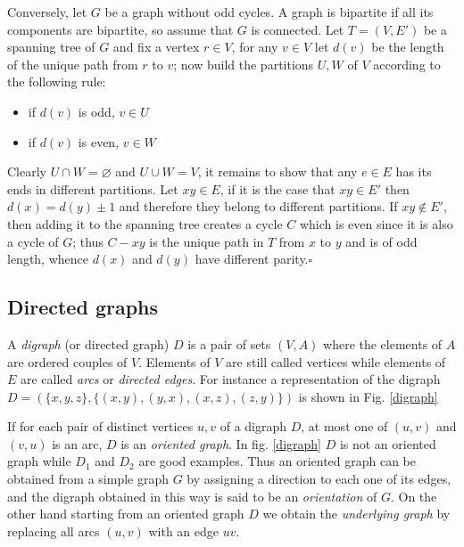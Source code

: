 \documentclass[a4paper,12pt,oneside]{book}
\newcommand*{\QED}{\hfill\ensuremath{\square}}
\let\emptyset\varnothing
\begin{document}
Conversely, let $G$ be a graph without odd cycles. A graph is bipartite if all its components are bipartite, so assume that $G$ is connected. Let $T=(V,E')$ be a spanning tree of $G$ and fix a vertex $r\in V$, for any $v\in V$ let $d(v)$ be the length of the unique path from $r$ to $v$; now build the partitions $U,W$ of $V$ according to the following rule:
\begin{itemize}
\item if $d(v)$ is odd, $v\in U$
\item if $d(v)$ is even, $v\in W$
\end{itemize} 
Clearly $U\cap W =\emptyset$ and $U\cup W=V$, it remains to show that any $e\in E$ has its ends in different partitions. 
Let $xy\in E$, if it is the case that $xy\in E'$ then $d(x)=d(y)\pm 1$ and therefore they belong to different partitions. If $xy\notin E'$, then adding it to the spanning tree creates a cycle $C$ which is even since it is also a cycle of $G$; thus $C-xy$ is the unique path in $T$ from $x$ to $y$ and is of odd length, whence $d(x)$ and $d(y)$ have different parity.\QED


\subsection*{Directed graphs}

A \textit{digraph} (or directed graph) $D$  is a pair of sets $(V,A)$ where the elements of $A$ are ordered couples of $V$. Elements of $V$ are still called vertices while elements of $E$ are called \textit{arcs} or \textit{directed edges}. For instance a representation of the digraph $D=(\{x,y,z\}, \{(x,y),(y,x),(x,z),(z,y)\})$ is shown in Fig. \ref{digraph}

If for each pair of distinct vertices $u,v$ of a digraph $D$, at most one of $(u,v)$ and $(v,u)$ is an arc, $D$ is an \textit{oriented graph}. In fig. \ref{digraph} $D$ is not an oriented graph while $D_1$ and $D_2$ are good examples. Thus an oriented graph can be obtained from a simple graph $G$ by assigning a direction to each one of its edges, and the digraph obtained in this way is said to be an \textit{orientation} of $G$. On the other hand starting from an oriented graph $D$ we obtain the \textit{underlying graph } by replacing all arcs $(u,v)$ with an edge $uv$. 
\end{document}
